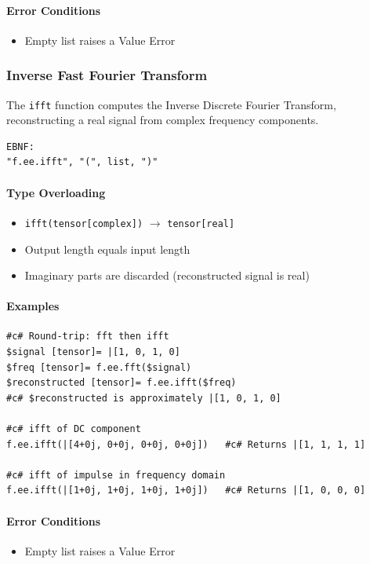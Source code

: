 \paragraph{Error Conditions}
\begin{itemize}
\item Empty list raises a Value Error
\end{itemize}

\subsubsection{Inverse Fast Fourier Transform}
The \texttt{ifft} function computes the Inverse Discrete Fourier Transform, reconstructing a real signal from complex frequency components.
\begin{verbatim}
EBNF:
"f.ee.ifft", "(", list, ")"
\end{verbatim}

\paragraph{Type Overloading}
\begin{itemize}
\item \texttt{ifft(tensor[complex])} $\rightarrow$ \texttt{tensor[real]}
\item Output length equals input length
\item Imaginary parts are discarded (reconstructed signal is real)
\end{itemize}

\paragraph{Examples}
\begin{verbatim}
#c# Round-trip: fft then ifft
$signal [tensor]= |[1, 0, 1, 0]
$freq [tensor]= f.ee.fft($signal)
$reconstructed [tensor]= f.ee.ifft($freq)
#c# $reconstructed is approximately |[1, 0, 1, 0]

#c# ifft of DC component
f.ee.ifft(|[4+0j, 0+0j, 0+0j, 0+0j])   #c# Returns |[1, 1, 1, 1]

#c# ifft of impulse in frequency domain
f.ee.ifft(|[1+0j, 1+0j, 1+0j, 1+0j])   #c# Returns |[1, 0, 0, 0]
\end{verbatim}

\paragraph{Error Conditions}
\begin{itemize}
\item Empty list raises a Value Error
\end{itemize}


